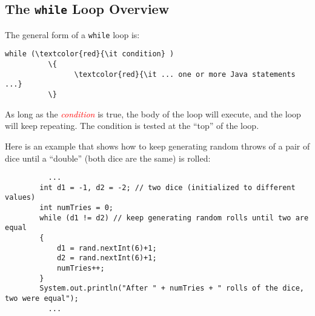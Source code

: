 \vspace{-0.1in}
\subsection*{The {\tt while} Loop Overview}
\vspace*{-.05in}
The general form of a {\tt while} loop is:
\begin{Verbatim}[commandchars=\\\{\}]
          while (\textcolor{red}{\it condition} )
          \{
                \textcolor{red}{\it ... one or more Java statements ...}
          \}
          \end{Verbatim}
          \vspace{-0.15in}
          As long as the \textcolor{red}{\it condition} is true, the body of the loop
          will execute, and the loop will
          keep repeating. The condition is tested at the ``top'' of the loop.

          \noindent Here is an example that shows how to keep generating random throws of a pair of dice
          until a ``double'' (both dice are the same) is rolled:
          \vspace{-0.2in}
          \begin{verbatim}
          ...
        int d1 = -1, d2 = -2; // two dice (initialized to different values)
        int numTries = 0;
        while (d1 != d2) // keep generating random rolls until two are equal
        {
            d1 = rand.nextInt(6)+1;
            d2 = rand.nextInt(6)+1;
            numTries++;
        }
        System.out.println("After " + numTries + " rolls of the dice, two were equal");
          ...
          \end{verbatim}

          \vspace*{-.15in}
